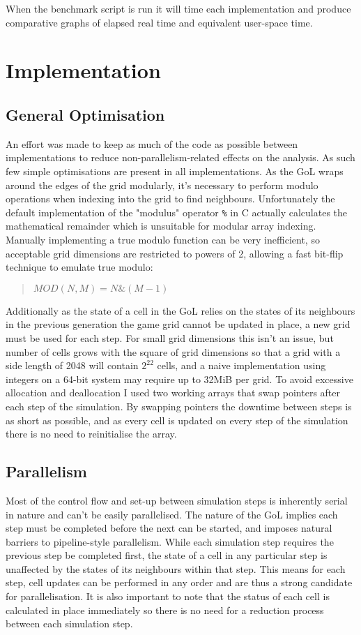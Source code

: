 \documentclass[]{article}
\begin{document}
When the benchmark script is run it will time each implementation and produce comparative graphs of elapsed real time and equivalent user-space time.

\section{Implementation}
\subsection{General Optimisation}
An effort was made to keep as much of the code as possible between implementations to reduce non-parallelism-related effects on the analysis. As such few simple optimisations are present in all implementations. As the GoL wraps around the edges of the grid modularly, it's necessary to perform modulo operations when indexing into the grid to find neighbours. Unfortunately the default implementation of the "modulus" operator \texttt{\%} in C actually calculates the mathematical remainder which is unsuitable for modular array indexing. Manually implementing a true modulo function can be very inefficient, so acceptable grid dimensions are restricted to powers of 2, allowing a fast bit-flip technique to emulate true modulo:
\begin{quote}
$MOD(N, M) = N \mathrel{\&}  (M - 1)$
\end{quote}

Additionally as the state of a cell in the GoL relies on the states of its neighbours in the previous generation the game grid cannot be updated in place, a new grid must be used for each step. For small grid dimensions this isn't an issue, but number of cells grows with the square of grid dimensions so that a grid with a side length of 2048 will contain $2^{22}$ cells, and a naive implementation using integers on a 64-bit system may require up to 32MiB per grid. To avoid excessive allocation and deallocation I used two working arrays that swap pointers after each step of the simulation. By swapping pointers the downtime between steps is as short as possible, and as every cell is updated on every step of the simulation there is no need to reinitialise the array.

\subsection{Parallelism}
Most of the control flow and set-up between simulation steps is inherently serial in nature and can't be easily parallelised. The nature of the GoL implies each step must be completed before the next can be started, and imposes natural barriers to pipeline-style parallelism. While each simulation step requires the previous step be completed first, the state of a cell in any particular step is unaffected by the states of its neighbours within that step. This means for each step, cell updates can be performed in any order and are thus a strong candidate for parallelisation. It is also important to note that the status of each cell is calculated in place immediately so there is no need for a reduction process between each simulation step.
\end{document}
